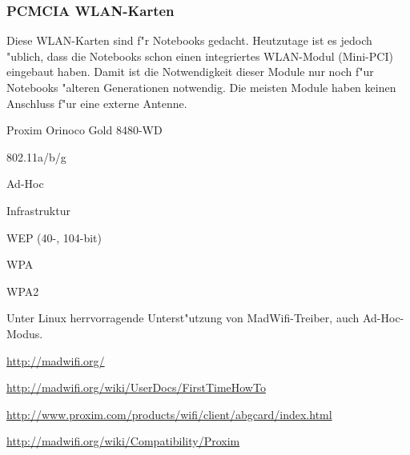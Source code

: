 \newpage
\subsubsection{PCMCIA WLAN-Karten}

Diese WLAN-Karten sind f"r Notebooks gedacht. Heutzutage ist es jedoch
"ublich, dass die Notebooks schon einen integriertes WLAN-Modul (Mini-PCI)
eingebaut haben. Damit ist die Notwendigkeit dieser Module nur noch f"ur
Notebooks "alteren Generationen notwendig. Die meisten Module haben keinen
Anschluss f"ur eine externe Antenne.

%
%
\begin{wlandevice}{Proxim Orinoco Gold 8480-WD}



\begin{wlanieeestandard}
\item 802.11a/b/g
\end{wlanieeestandard}

\begin{wlanmode}
\item Ad-Hoc
\item Infrastruktur
\end{wlanmode}

\begin{wlansecurity}
\item WEP (40-, 104-bit)
\item WPA
\item WPA2
\end{wlansecurity}

\begin{wlandriver}
\item
Unter Linux herrvorragende Unterst"utzung von MadWifi-Treiber,
auch Ad-Hoc-Modus.

\url{http://madwifi.org/}
\end{wlandriver}


\begin{wlaninstall}
\item
\url{http://madwifi.org/wiki/UserDocs/FirstTimeHowTo}
\end{wlaninstall}

\begin{wlanlink}
\item \url{http://www.proxim.com/products/wifi/client/abgcard/index.html}
\item \url{http://madwifi.org/wiki/Compatibility/Proxim}
\end{wlanlink}

\end{wlandevice}


